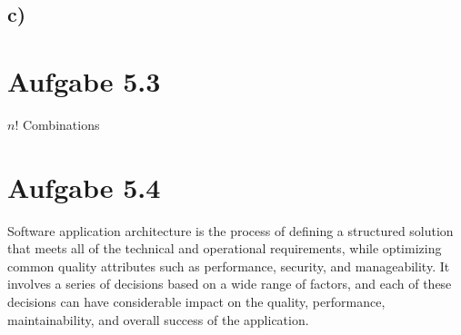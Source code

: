 \documentclass[a4paper,10pt]{scrartcl}[2003/01/01]
\begin{document}
        \subsection*{c)}
        
    \section*{Aufgabe 5.3}
    
$n!$ Combinations
   
    \section*{Aufgabe 5.4}
Software application architecture is the process of defining a structured solution that meets all of the technical and operational requirements, while optimizing common quality attributes such as performance, security, and manageability. It involves a series of decisions based on a wide range of factors, and each of these decisions can have considerable impact on the quality, performance, maintainability, and overall success of the application.
\end{document}
